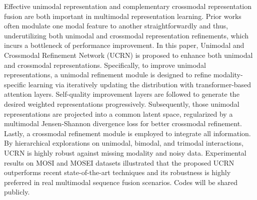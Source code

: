 Effective unimodal representation and complementary crossmodal representation fusion are both important in multimodal representation learning. Prior works often modulate one modal feature to another straightforwardly and thus, underutilizing both unimodal and crossmodal representation refinements, which incurs a bottleneck of performance improvement. In this paper, Unimodal and Crossmodal Refinement Network (UCRN) is proposed to enhance both unimodal and crossmodal representations. Specifically, to improve unimodal representations, a unimodal refinement module is designed to refine modality-specific learning via iteratively updating the distribution with transformer-based attention layers. Self-quality improvement layers are followed to generate the desired weighted representations progressively. Subsequently, those unimodal representations are projected into a common latent space, regularized by a multimodal Jensen-Shannon divergence loss for better crossmodal refinement. Lastly, a crossmodal refinement module is employed to integrate all information. By hierarchical explorations on unimodal, bimodal, and trimodal interactions, UCRN is highly robust against missing modality and noisy data. Experimental results on MOSI and MOSEI datasets illustrated that the proposed UCRN outperforms recent state-of-the-art techniques and its robustness is highly preferred in real multimodal sequence fusion scenarios. Codes will be shared publicly.
